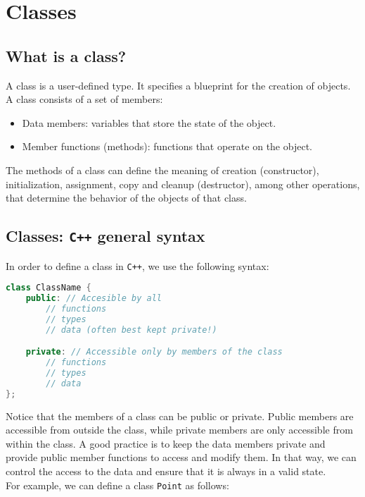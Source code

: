 \chapter{Classes}

\section{What is a class?}

A class is a user-defined type. It specifies a blueprint for the creation of
objects. A class consists of a set of members:

\begin{itemize}
    \item Data members: variables that store the state of the object.
    \item Member functions (methods): functions that operate on the object.
\end{itemize}

The methods of a class can define the meaning of creation (constructor),
initialization, assignment, copy and cleanup (destructor), among other
operations, that determine the behavior of the objects of that class.

\section{Classes: \texttt{C++} general syntax}

In order to define a class in \texttt{C++}, we use the following syntax:\\

\begin{lstlisting}[language=C++]
class ClassName {
    public: // Accesible by all
        // functions
        // types
        // data (often best kept private!)

    private: // Accessible only by members of the class
        // functions
        // types
        // data
};
\end{lstlisting}

Notice that the members of a class can be public or private. Public members are
accessible from outside the class, while private members are only accessible
from within the class. A good practice is to keep the data members private and
provide public member functions to access and modify them. In that way, we can
control the access to the data and ensure that it is always in a valid state.\\

For example, we can define a class \texttt{Point} as follows:\\

